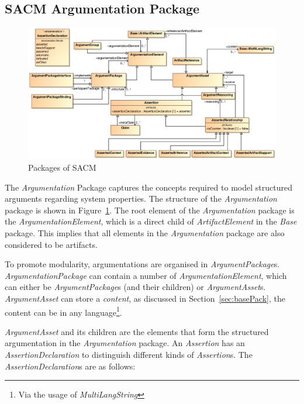 \subsection{SACM Argumentation Package}
\label{sec:argPack}
\begin{figure}
	\centering
	\includegraphics[width=1\linewidth]{fig/Argumentation.eps}
	\caption{Packages of SACM}
	\label{fig:arg}
\end{figure}
The \textit{Argumentation} Package captures the concepts required to model structured arguments regarding system properties. The structure of the \textit{Argumentation} package is shown in Figure~\ref{fig:arg}.
The root element of the \textit{Argumentation} package is the \textit{ArgumentationElement}, which is a direct child of \textit{ArtifactElement} in the \textit{Base} package. This implies that all elements in the \textit{Argumentation} package are also considered to be artifacts. 

To promote modularity, argumentations are organised in \textit{ArgumentPackage}s. \textit{ArgumentationPackage} can contain a number of \textit{ArgumentationElement}, which can either be \textit{ArgumentPackage}s (and their children) or \textit{ArgumentAsset}s. \textit{ArgumentAsset} can store a \textit{content}, as discussed in Section~\ref{sec:basePack}, the content can be in any language\footnote{Via the usage of \textit{MultiLangString}}.

\textit{ArgumentAsset} and its children are the elements that form the structured argumentation in the \textit{Argumentation} package. An \textit{Assertion} has an \textit{AssertionDeclaration} to distinguish different kinds of \textit{Assertion}s. The \textit{AssertionDeclaration}s are as follows: 

